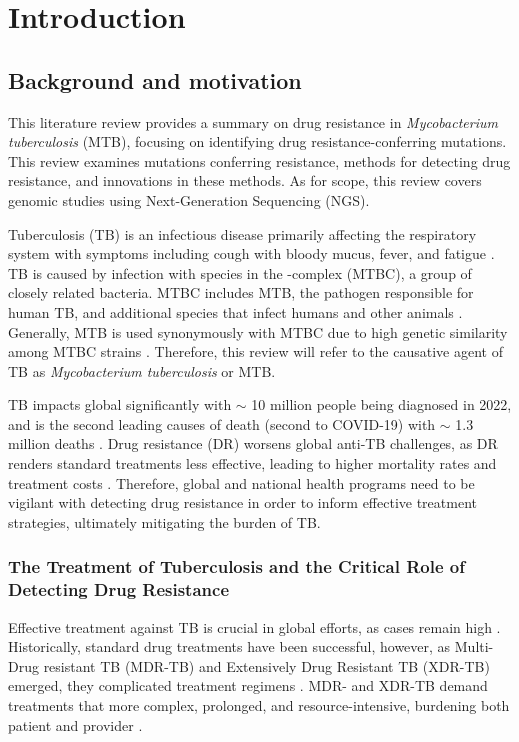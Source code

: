 \graphicspath{{Figures/Introduction}}

\chapter{Introduction}\label{ch:intro}

\section{Background and motivation}\label{intro:sec:background}
This literature review provides a summary on drug resistance in \textit{Mycobacterium tuberculosis} (MTB), focusing on identifying drug resistance-conferring mutations. This review examines mutations conferring resistance, methods for detecting drug resistance, and innovations in these methods. As for scope, this review covers genomic studies using Next-Generation Sequencing (NGS).

Tuberculosis (TB) is an infectious disease primarily affecting the respiratory system  with symptoms including cough with bloody mucus, fever, and fatigue \cite{pai2016}. TB is caused by infection with species in the \mtb-complex (MTBC), a group of closely related bacteria. MTBC includes MTB, the pathogen responsible for human TB, and additional species that infect humans and other animals \cite{gagneux2018}. Generally, MTB is used synonymously with MTBC \cite{riojas2018} due to high genetic similarity among MTBC strains \cite{gagneux2018}. Therefore, this review will refer to the causative agent of TB as \textit{Mycobacterium tuberculosis} or MTB.

TB impacts global significantly with $\sim$ 10 million people being diagnosed in 2022, and is the second leading causes of death (second to COVID-19) with $\sim$ 1.3 million deaths \cite{who2022}. Drug resistance (DR) worsens global anti-TB challenges, as DR renders standard treatments less effective, leading to higher mortality rates and treatment costs \cite{who2022}. Therefore, global and national health programs need to be vigilant with detecting drug resistance in order to inform effective treatment strategies, ultimately mitigating the burden of TB.
\subsection{The Treatment of Tuberculosis and the Critical Role of Detecting Drug Resistance}

Effective treatment against TB is crucial in global efforts, as cases remain high \cite{who2022}. Historically, standard drug treatments have been successful, however, as Multi-Drug resistant TB (MDR-TB) and Extensively Drug Resistant TB (XDR-TB) emerged, they complicated treatment regimens \cite{whitney2016}.  MDR- and XDR-TB demand treatments that more complex, prolonged, and resource-intensive, burdening both patient and provider \cite{whitney2016}. 

